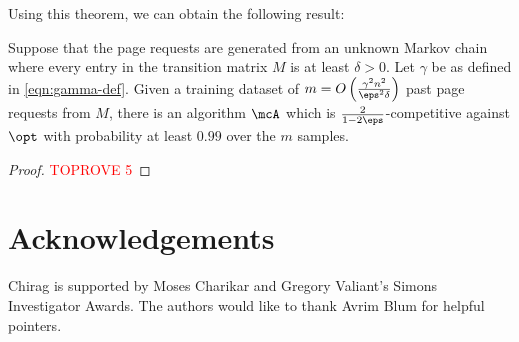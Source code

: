 \documentclass[11pt]{article}
\begin{document}
Using this theorem, we can obtain the following result:

\begin{theorem}
    \label{thm:approx-lpr-from-samples}
    Suppose that the page requests are generated from an unknown Markov chain where every entry in the transition matrix $M$ is at least $\delta > 0$. Let $\gamma$ be as defined in \eqref{eqn:gamma-def}. Given a training dataset of $m = O\left(\frac{\gamma^2n^2}{\eps^2\delta}\right)$ past page requests from $M$, there is an algorithm $\mcA$ which is $\frac{2}{1-2\eps}$-competitive against $\opt$ with probability at least $0.99$ over the $m$ samples.
\end{theorem}
\begin{proof}\textcolor{red}{TOPROVE 5}\end{proof}
 
\section*{Acknowledgements}
Chirag is supported by Moses Charikar and Gregory Valiant's Simons Investigator Awards. The authors would like to thank Avrim Blum for helpful pointers.



\end{document}
